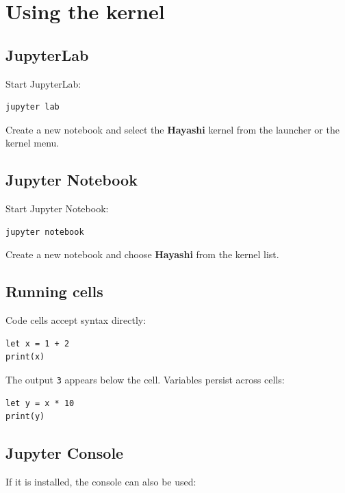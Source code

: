 \section{Using the kernel}

\subsection{JupyterLab}

Start JupyterLab:

\begin{lstlisting}[style=inline, language=sh]
jupyter lab
\end{lstlisting}

Create a new notebook and select the \textbf{Hayashi} kernel from the launcher or
the kernel menu.

\subsection{Jupyter Notebook}

Start Jupyter Notebook:

\begin{lstlisting}[style=inline, language=sh]
jupyter notebook
\end{lstlisting}

Create a new notebook and choose \textbf{Hayashi} from the kernel list.

\subsection{Running cells}

Code cells accept \hayashi{} syntax directly:

\begin{lstlisting}[caption={Example cell in Jupyter}]
let x = 1 + 2
print(x)
\end{lstlisting}

The output \texttt{3} appears below the cell. Variables persist across cells:

\begin{lstlisting}[caption={Later cell in the same session}]
let y = x * 10
print(y)
\end{lstlisting}

\subsection{Jupyter Console}

If it is installed, the console can also be used:

